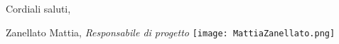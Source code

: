 Cordiali saluti,

\begin{minipage}[b]{0.7\textwidth}
    \centering
\end{minipage}
    \hfill
\begin{minipage}[b]{0.3\textwidth}
    \centering
    Zanellato Mattia,
    \textit{Responsabile di progetto}
    \texttt{[image: MattiaZanellato.png]}
\end{minipage}